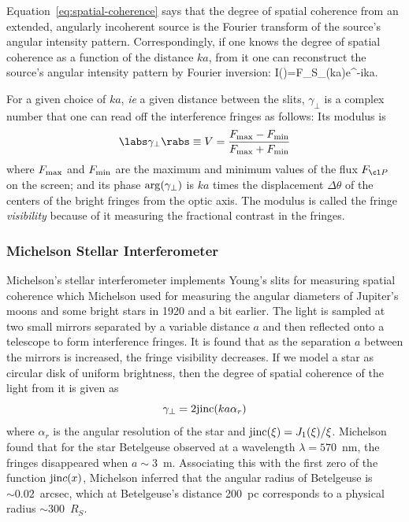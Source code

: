 Equation~\ref{eq:spatial-coherence} says that the degree of spatial coherence from an extended, angularly incoherent source is the Fourier transform of the source's angular intensity pattern. Correspondingly, if one knows the degree of spatial coherence as a function of the distance $ka$, from it one can reconstruct the source's angular intensity pattern by Fourier inversion:
\be
I(\alpha)=F_S\gamma_\perp(ka)e^{-ika\alpha}.
\label{eq:fourier-coherence}
\ee

For a given choice of $ka$, {\it ie} a given distance between the slits, $\gamma_\perp$ is a complex number that one can read off the interference fringes as follows: Its modulus is 
\[
\labs\gamma_\perp\rabs\equiv V={F_{\rm max}-F_{\rm min}\over F_{\rm max}+F_{\rm min}}
\]
where $F_{\rm max}$ and $F_{\rm min}$ are the maximum and minimum values of the flux $F_{\cl P}$ on the screen; and its phase ${\rm arg}(\gamma_\perp)$ is $ka$ times the displacement $\Delta\theta$ of the centers of the bright fringes from the optic axis. The modulus is called the fringe {\it visibility} because of it measuring the fractional contrast in the fringes. 

\subsubsection{Michelson Stellar Interferometer}

Michelson's stellar interferometer implements Young's slits for measuring spatial coherence which Michelson used for measuring the angular diameters of Jupiter's 
moons and some bright stars in 1920 and a bit earlier. The light is sampled at two 
small mirrors separated by a variable distance $a$ and then reflected onto a telescope 
to form interference fringes. It is found that as the separation $a$ between the mirrors 
is increased, the fringe visibility decreases. If we model a star as circular disk of 
uniform brightness, then the degree of spatial coherence of the light from it is given
as 
\[
\gamma_\perp=2{\rm jinc}(ka\alpha_r)
\]
where $\alpha_r$ is the angular resolution of the star and 
${\rm jinc}(\xi)={J_1(\xi)/\xi}$. Michelson found that for the star Betelgeuse observed
at a wavelength $\lambda=570$~nm, the fringes disappeared when $a\sim 3$~m. 
Associating this with the first zero of the function ${\rm jin}c(x)$, Michelson inferred that
the angular radius of Betelgeuse is $\sim 0.02$~arcsec, which at Betelgeuse's distance
200~pc corresponds to a physical radius $\sim 300$~$R_S$.

